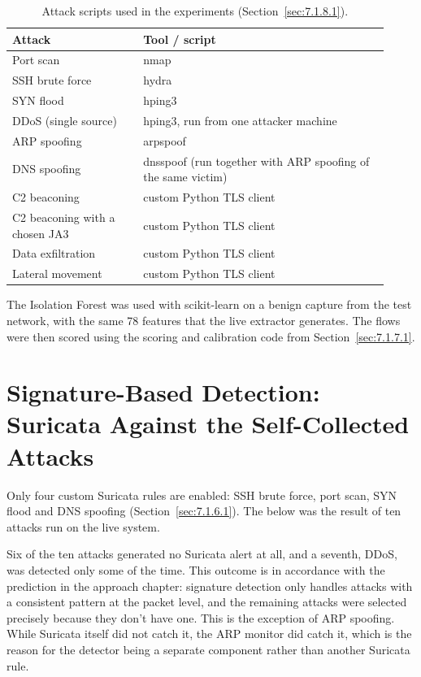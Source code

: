 \begin{table}[H]
\centering
\caption{Attack scripts used in the experiments (Section~\ref{sec:7.1.8.1}).}\label{tab:attackscripts}
\begin{tabular}{|>{\raggedright\arraybackslash}p{0.32\linewidth}|>{\raggedright\arraybackslash}p{0.60\linewidth}|}
\hline
\textbf{Attack} & \textbf{Tool / script} \\ \hline
Port scan & nmap \\ \hline
SSH brute force & hydra \\ \hline
SYN flood & hping3 \\ \hline
DDoS (single source) & hping3, run from one attacker machine \\ \hline
ARP spoofing & arpspoof \\ \hline
DNS spoofing & dnsspoof (run together with ARP spoofing of the same victim) \\ \hline
C2 beaconing & custom Python TLS client \\ \hline
C2 beaconing with a chosen JA3 & custom Python TLS client \\ \hline
Data exfiltration & custom Python TLS client \\ \hline
Lateral movement & custom Python TLS client \\ \hline
\end{tabular}
\end{table}

\noindent The Isolation Forest was used with scikit-learn on a benign capture from the test network, with the same 78 features that the live extractor generates. The flows were then scored using the scoring and calibration code from Section~\ref{sec:7.1.7.1}.

\section{Signature-Based Detection: Suricata Against the Self-Collected Attacks}\label{sec:9.2}

\noindent Only four custom Suricata rules are enabled: SSH brute force, port scan, SYN flood and DNS spoofing (Section~\ref{sec:7.1.6.1}). The below was the result of ten attacks run on the live system.

\noindent Six of the ten attacks generated no Suricata alert at all, and a seventh, DDoS, was detected only some of the time. This outcome is in accordance with the prediction in the approach chapter: signature detection only handles attacks with a consistent pattern at the packet level, and the remaining attacks were selected precisely because they don't have one. This is the exception of ARP spoofing. While Suricata itself did not catch it, the ARP monitor did catch it, which is the reason for the detector being a separate component rather than another Suricata rule.

